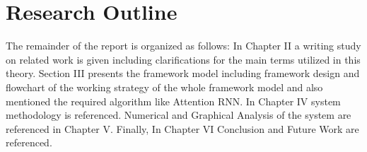 
\section{Research Outline}
The remainder of the report is organized as follows: In Chapter II a writing study on related work is given including clarifications for the main terms utilized in this theory. Section III presents the framework model including framework design and flowchart of the working strategy of the whole framework model and also mentioned the required algorithm like Attention RNN. In Chapter IV system methodology is referenced. Numerical and Graphical Analysis of the system are referenced in Chapter V. Finally, In Chapter VI Conclusion and Future Work are referenced.





\label{sec:EffSearch} 

